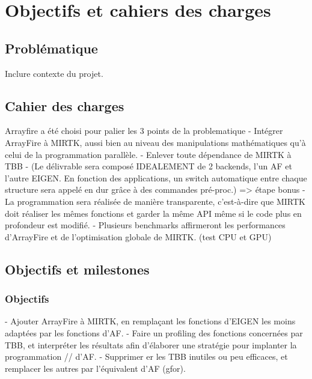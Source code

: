 \documentclass[12pt]{report}
\begin{document}
\chapter{Objectifs et cahiers des charges}
	\section{Problématique} Inclure contexte du projet.
	
	
	 

	\section{Cahier des charges}
	Arrayfire a été choisi pour palier les 3 points de la problematique \newline
	- Intégrer ArrayFire à MIRTK, aussi bien au niveau des manipulations mathématiques qu'à celui de la programmation parallèle.
	\newline- Enlever toute dépendance de MIRTK à TBB
	\newline- (Le délivrable sera composé IDEALEMENT de 2 backends, l'un AF et l'autre EIGEN. En fonction des applications, un switch automatique entre chaque structure sera appelé en dur grâce à des commandes pré-proc.) => étape bonus
	\newline- La programmation sera réalisée de manière transparente, c'est-à-dire que MIRTK doit réaliser les mêmes fonctions et garder la même API même si le code plus en profondeur est modifié.
	\newline- Plusieurs benchmarks affirmeront les performances d'ArrayFire et de l'optimisation globale de MIRTK. (test CPU et GPU)
	
	\section{Objectifs et milestones}
	\subsection{Objectifs}- Ajouter ArrayFire à MIRTK, en remplaçant les fonctions d'EIGEN les moins adaptées par les fonctions d'AF. \newline
	- Faire un profiling des fonctions concernées par TBB, et interpréter les résultats afin d'élaborer une stratégie pour implanter la programmation // d'AF.\newline
	- Supprimer er les TBB inutiles ou peu efficaces, et remplacer les autres par l'équivalent d'AF (gfor).\newline
	
\end{document}
